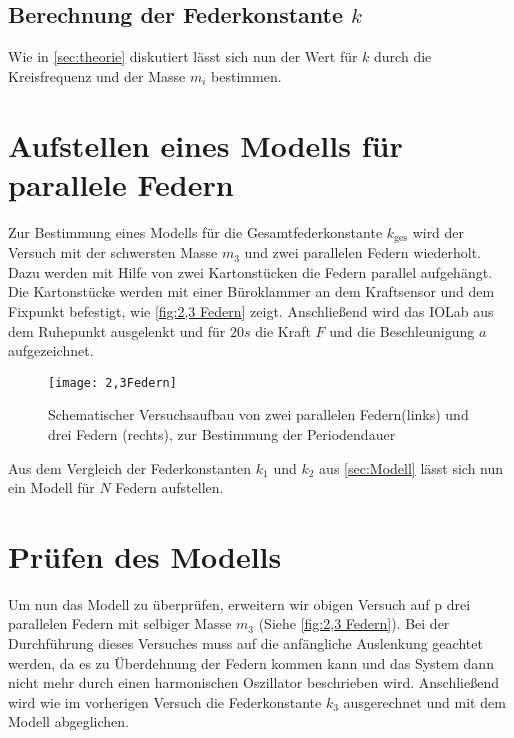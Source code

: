 \subsection{Berechnung der Federkonstante \( k \)}
Wie in \autoref{sec:theorie} diskutiert lässt sich nun der Wert für $k$ durch die Kreisfrequenz und der Masse $m_i$ bestimmen.
\section{Aufstellen eines Modells für parallele Federn}
\label{sec:Modell}
Zur Bestimmung eines Modells für die Gesamtfederkonstante $k_{\text{ges}}$ wird der Versuch mit der schwersten  Masse $m_3$ und zwei parallelen Federn wiederholt. Dazu werden mit Hilfe von zwei Kartonstücken die Federn parallel aufgehängt. Die Kartonstücke werden mit einer Büroklammer an dem Kraftsensor und dem Fixpunkt befestigt, wie \autoref{fig:2,3 Federn} zeigt. Anschließend wird das IOLab aus dem Ruhepunkt ausgelenkt und für $20s$ die Kraft $F$ und die Beschleunigung $a$ aufgezeichnet.
\begin{figure}[H]
	\centering
	\texttt{[image: 2,3Federn]}
	\caption[Versuchsaufbau mit mehreren Federn]{Schematischer Versuchsaufbau von zwei parallelen Federn(links) und drei Federn (rechts), zur Bestimmung der Periodendauer}
	\label{fig:2,3 Federn}
\end{figure}
Aus dem Vergleich der Federkonstanten $k_1$ und $k_2$ aus \autoref{sec:Modell} lässt sich nun ein Modell für $N$ Federn aufstellen.
\section{Prüfen des Modells}
Um nun das Modell zu überprüfen, erweitern wir obigen Versuch auf p drei parallelen Federn mit selbiger Masse $m_3$ (Siehe \autoref{fig:2,3 Federn}). Bei der Durchführung dieses Versuches muss auf die anfängliche Auslenkung geachtet werden, da es zu Überdehnung der Federn kommen kann und das System dann nicht mehr durch einen harmonischen Oszillator beschrieben wird. Anschließend wird wie im vorherigen Versuch die Federkonstante \( k_3 \) ausgerechnet und mit dem Modell abgeglichen.